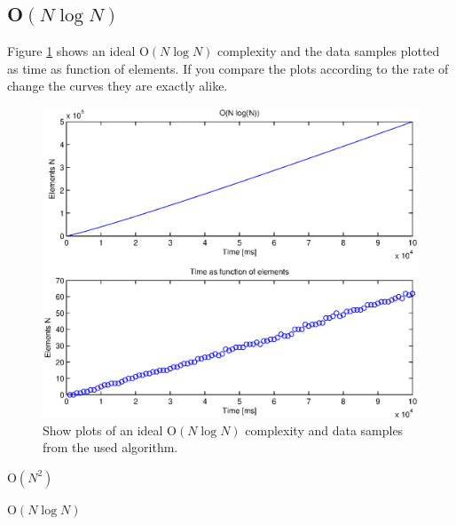 \subsection{O\(\left( N\log {N }  \right) \)}
Figure \ref{fig:test2} shows an ideal O\(\left( N\log {N }  \right) \) complexity and the data samples plotted as time as function of elements. If you compare the plots according to the rate of change the curves they are exactly alike. 



\begin{figure}[th!]
\centering
\includegraphics[width=1\textwidth]{./graphics/test2.eps}
\caption{Show plots of an ideal O\(\left( N\log {N }  \right) \) complexity and data samples from the used algorithm.}
\label{fig:test2}
\end{figure}



O\(\left( { N }^{ 2 } \right)\)

O\(\left( N\log {N }  \right) \)
